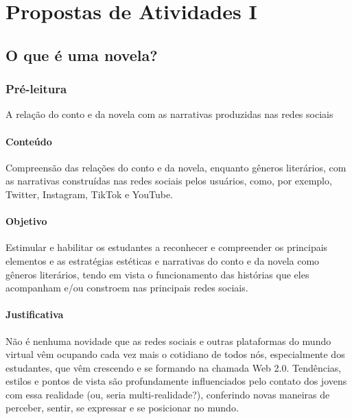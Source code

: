 \documentclass[12pt]{extarticle}
\begin{document}
\tableofcontents


\section{Propostas de Atividades I}

\subsection{O que é uma novela?}

\subsubsection{Pré-leitura} A relação do conto e da novela com as narrativas produzidas nas redes sociais




\paragraph{Conteúdo} Compreensão das relações do conto e da novela,
enquanto gêneros literários, com as narrativas construídas nas redes
sociais pelos usuários, como, por exemplo, Twitter, Instagram, TikTok e
YouTube.

\paragraph{Objetivo} Estimular e habilitar os estudantes a reconhecer e
compreender os principais elementos e as estratégias estéticas e
narrativas do conto e da novela como gêneros literários, tendo em vista
o funcionamento das histórias que eles acompanham e/ou constroem nas
principais redes sociais.

\paragraph{Justificativa} Não é nenhuma novidade que as redes sociais e
outras plataformas do mundo virtual vêm ocupando cada vez mais o
cotidiano de todos nós, especialmente dos estudantes, que vêm crescendo
e se formando na chamada Web 2.0. Tendências, estilos e pontos de vista
são profundamente influenciados pelo contato dos jovens com essa
realidade (ou, seria multi-realidade?), conferindo novas maneiras de
perceber, sentir, se expressar e se posicionar no mundo.
\end{document}

